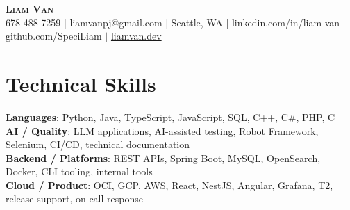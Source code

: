 \documentclass[letterpaper,11pt]{article}
\begin{document}

%
\begin{center}
    \textbf{\Huge \scshape Liam Van} \\ \vspace{1pt}
    \small 678-488-7259 $|$ \small {liamvanpj@gmail.com} $|$ Seattle, WA
 {{$|$ linkedin.com/in/liam-van} {$|$ github.com/SpeciLiam} {$|$ \href{https://liamvan.dev}{liamvan.dev}}}

\end{center}

\section{Technical Skills}
 \begin{itemize}[leftmargin=0.15in, label={}]
    \small{\item{
     \textbf{Languages}{: Python, Java, TypeScript, JavaScript, SQL, C++, C\#, PHP, C} \\
     \textbf{AI / Quality}{: LLM applications, AI-assisted testing, Robot Framework, Selenium, CI/CD, technical documentation} \\
     \textbf{Backend / Platforms}{: REST APIs, Spring Boot, MySQL, OpenSearch, Docker, CLI tooling, internal tools} \\
     \textbf{Cloud / Product}{: OCI, GCP, AWS, React, NestJS, Angular, Grafana, T2, release support, on-call response} \\
    }}
 \end{itemize}
%

\end{document}
